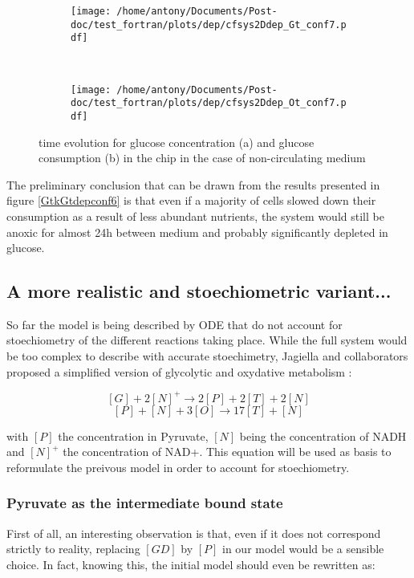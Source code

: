 \documentclass[11pt,a4paper]{article}
\begin{document}
\begin{figure}[ht!]
	\begin{subfigure}{0.45\textwidth}
	\centering
	\texttt{[image: /home/antony/Documents/Post-doc/test\_fortran/plots/dep/cfsys2Ddep\_Gt\_conf7.pdf]}
	\caption{ \label{Gtdep_conf7}}
	\end{subfigure}
	~~
	\begin{subfigure}{0.45\textwidth}
	\texttt{[image: /home/antony/Documents/Post-doc/test\_fortran/plots/dep/cfsys2Ddep\_Ot\_conf7.pdf]}
		\caption{ \label{Otdep_conf7}}
	\end{subfigure}
	\caption{time evolution for glucose concentration (a) and glucose consumption (b) in the chip in the case of non-circulating medium \label{GtkGtdepconf7}}
\end{figure}

The preliminary conclusion that can be drawn from the results presented in figure \ref{GtkGtdepconf6} is that even if a majority of cells slowed down their consumption as a result of less abundant nutrients, the system would still be anoxic for almost 24h between medium and probably significantly depleted in glucose.

\subsection{A more realistic and stoechiometric variant...}
So far the model is being described by ODE that do not account for stoechiometry of the different reactions taking place. While the full system would be too complex to describe with accurate stoechimetry, Jagiella and collaborators proposed a simplified version of glycolytic and oxydative metabolism :

\[ [G] + 2[N]^+ \rightarrow 2[P] + 2[T] + 2[N]  \]
\[ [P] + [N] + 3[O] \rightarrow 17[T] + [N]\]

with $[P]$ the concentration in Pyruvate, $[N]$ being the concentration of NADH and $[N]^+$ the concentration of NAD+. This equation will be used as basis to reformulate the preivous model in order to account for stoechiometry.

\subsubsection{Pyruvate as the intermediate bound state} 
First of all, an interesting observation is that, even if it does not correspond strictly to reality, replacing $[GD]$ by $[P]$ in our model would be a sensible choice. In fact, knowing this, the initial model should even be rewritten as: 
\end{document}
